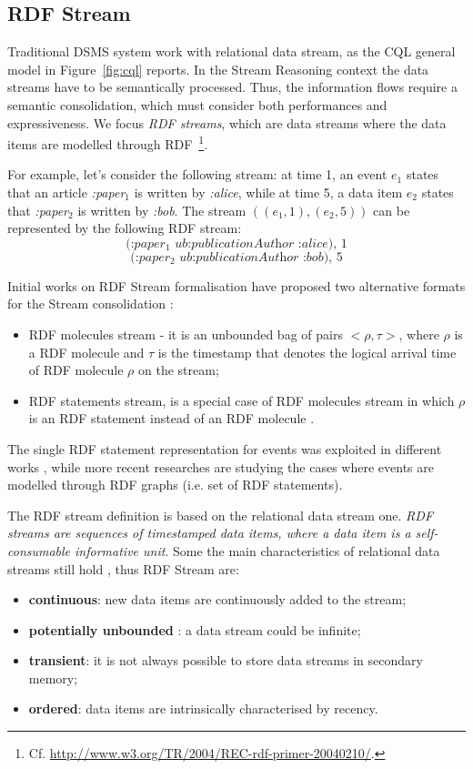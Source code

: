 \subsection{RDF Stream}\label{sec:rdfstream}

Traditional DSMS system work with relational data stream, as the CQL general model in Figure~\ref{fig:cql} reports. In the Stream Reasoning context the data streams have to be semantically processed. Thus, the information flows require a semantic consolidation, which must consider both performances and expressiveness. We focus \textit{RDF streams}, which are data streams where the data items are modelled through RDF~\footnote{Cf. \url{http://www.w3.org/TR/2004/REC-rdf-primer-20040210/}.}. 

For example, let's consider the following stream: at time 1, an event $e_1$ states that an article \textit{:paper$_1$} is written by \textit{:alice}, while at time 5, a data item $e_2$ states that \textit{:paper$_2$} is written by \textit{:bob}. The stream $((e_1,1),(e_2,5))$ can be represented by the following RDF stream:
\[\textit{(:paper$_1$ ub:publicationAuthor :alice), 1}\]
\[\textit{(:paper$_2$ ub:publicationAuthor :bob), 5}\]

Initial works on RDF Stream formalisation have proposed two alternative formats for the Stream consolidation \cite{DBLP:conf/fis/ValleCBBC08}:
\begin{itemize}
\item RDF molecules stream - it is an unbounded bag of pairs $< \rho, \tau >$, where $\rho$ is a RDF molecule \cite{TrackingMolecules} and $\tau$ is the timestamp that denotes the logical arrival time of RDF molecule $\rho$ on the stream;
\item RDF statements stream, is a special case of RDF molecules stream in which $\rho$ is an RDF statement instead of an RDF molecule  .
\end{itemize} 

The single RDF statement representation for events was exploited in different works  \cite{Barbieri2010,Lephuoc2011}, while more recent researches \cite{DBLP:conf/semweb/BalduiniVDTPC13} are studying the cases where events are modelled through RDF graphs (i.e. set of RDF statements). 

The  RDF stream  definition is based on the relational data stream one. \textit{RDF streams are sequences of timestamped data items, where a data item is a self- consumable informative unit}. Some the main characteristics of relational data streams still hold \cite{DBLP:conf/pods/BabcockBDMW02}, thus RDF Stream are:
\begin{itemize}
\item \textbf{continuous}: new data items are continuously added to the stream;
\item \textbf{potentially unbounded} : a data stream could be infinite;
\item \textbf{transient}: it is not always possible to store data streams in secondary memory;
\item \textbf{ordered}: data items are intrinsically characterised by recency.
\end{itemize}

